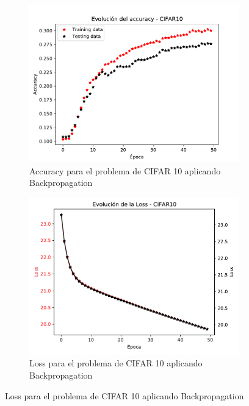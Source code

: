 \begin{figure}[H]
     \centering
     \begin{subfigure}[b]{0.45\textwidth}
         \centering
         \includegraphics[width=\textwidth]{image/EJ3_Acc_SIG_LIN_MSE.pdf}
         \caption{Accuracy para el problema de CIFAR 10 aplicando Backpropagation}
         \label{fig:acc6a}
     \end{subfigure}
     \hfill
     \begin{subfigure}[b]{0.45\textwidth}
         \centering
         \includegraphics[width=\textwidth]{image/EJ3_Loss_SIG_LIN_MSE.pdf}
         \caption{Loss para el problema de CIFAR 10 aplicando Backpropagation}
         \label{fig:loss6a}
     \end{subfigure}
\end{figure}

